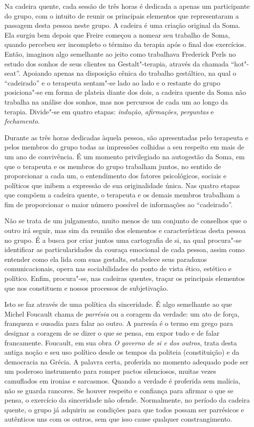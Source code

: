 Na cadeira quente, cada sessão de três horas é dedicada a apenas um
participante do grupo, com o intuito de reunir os principais elementos
que representaram a passagem desta pessoa neste grupo. A cadeira é uma
criação original da Soma. Ela surgiu bem depois que Freire começou a
nomear seu trabalho de Soma, quando percebeu ser incompleto o término da
terapia após o final dos exercícios. Então, imaginou algo semelhante ao
jeito como trabalhava Frederick Perls no estudo dos sonhos de seus
clientes na Gestalt"-terapia, através da chamada ``hot"-seat''. Apoiando
apenas na disposição cênica do trabalho gestáltico, na qual o
``cadeirado'' e o terapeuta sentam"-se lado ao lado e o restante do grupo
posiciona"-se em forma de plateia diante dos dois, a cadeira quente da
Soma não trabalha na análise dos sonhos, mas nos percursos de cada um ao
longo da terapia. Divide"-se em quatro etapas: \emph{indução},
\emph{afirmações}, \emph{perguntas} e \emph{fechamento}.

Durante as três horas dedicadas àquela pessoa, são apresentadas pelo
terapeuta e pelos membros do grupo todas as impressões colhidas a seu
respeito em mais de um ano de convivência. É um momento privilegiado na
autogestão da Soma, em que o terapeuta e os membros do grupo trabalham
juntos, no sentido de proporcionar a cada um, o entendimento dos fatores
psicológicos, sociais e políticos que inibem a expressão de sua
originalidade única. Nas quatro etapas que compõem a cadeira quente, o
terapeuta e os demais membros trabalham a fim de proporcionar o maior
número possível de informações ao ``cadeirado''.

Não se trata de um julgamento, muito menos de um conjunto de conselhos
que o outro irá seguir, mas sim da reunião dos elementos e
características desta pessoa no grupo. É a busca por criar juntos uma
cartografia de si, na qual procura"-se identificar as particularidades da
couraça emocional de cada pessoa, assim como entender como ela lida com
suas gestalts, estabelece seus paradoxos comunicacionais, opera nas
sociabilidades do ponto de vista ético, estético e político. Enfim,
procura"-se, nas cadeiras quentes, traçar os principais elementos que nos
constituem e nossos processos de subjetivação.

Isto se faz através de uma política da sinceridade. É algo semelhante ao
que Michel Foucault chama de \emph{parrésia} ou a coragem da verdade: um
ato de força, franqueza e ousadia para falar ao outro. A parresía é o
termo em grego para designar a coragem de se dizer o que se pensa, em
expor tudo e de falar francamente. Foucault, em sua obra \emph{O governo
de si e dos outros,} trata desta antiga noção e seu uso político desde
os tempos da politeia (constituição) e da democracia na Grécia. A
palavra certa, proferida no momento adequado pode ser um poderoso
instrumento para romper pactos silenciosos, muitas vezes camuflados em
ironias e sarcasmos. Quando a verdade é proferida sem malícia, não se
guarda rancores. Se houver respeito e confiança para afirmar o que se
pensa, o exercício da sinceridade não ofende. Normalmente, no período da
cadeira quente, o grupo já adquiriu as condições para que todos possam
ser parrésicos e autênticos uns com os outros, sem que isso cause
qualquer constrangimento.


